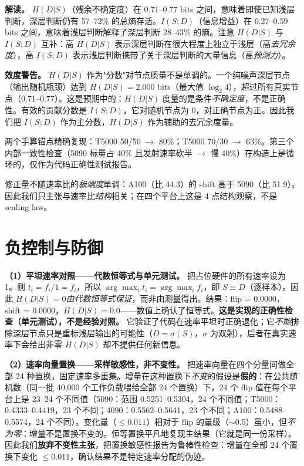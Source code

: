 \documentclass[10pt]{article}
\begin{document}
\textbf{解读。} $H(D|S)$（残余不确定度）在 0.71--0.77 bits 之间，意味着即使已知浅层判断，深层判断仍有 57--72\% 的总熵存活。$I(S;D)$（信息增益）在 0.27--0.59 bits 之间，意味着浅层判断解释了深层判断 28--43\% 的熵。注意 $H(D|S)$ 与 $I(S;D)$ 互补：高 $H(D|S)$ 表示深层判断在很大程度上独立于浅层（高\emph{去冗余度}），高 $I(S;D)$ 表示浅层判断携带了关于深层判断的大量信息（高\emph{预测力}）。

\textbf{效度警告。} $H(D|S)$ 作为"分数"对节点质量不是单调的。一个纯噪声深层节点（输出随机瓶颈）达到 $H(D|S)=2.000$ bits（最大值 $\log_2 4$），超过所有真实节点（0.71--0.77）。这是预期中的：$H(D|S)$ 度量的是条件\emph{不确定度}，不是正确性。有效的贡献分数是 $I(S;D)$，它对随机节点为 0，对正确节点为正。因此我们把 $I(S;D)$ 作为主分数，$H(D|S)$ 作为辅助的去冗余度量。

两个手算锚点精确复现：T5000 50/50 $\rightarrow$ 80\%；T5000 70/30 $\rightarrow$ 63\%。第三个内部一致性检查（5090 标量占 40\% 且发射速率砍半 $\rightarrow$ 慢 40\%）在构造上是循环的，仅作为代码正确性测试报告。

修正量不随速率比的\emph{极端度}单调：A100（比 44.3）的 shift 高于 5090（比 51.9）。因此我们只主张与速率比\emph{结构}相关；在四个平台上这是 4 点结构观察，不是 scaling law。

\section{负控制与防御}\label{negative-controls-and-defenses}

\textbf{（1）平坦速率对照——代数恒等式与单元测试。} 把占位硬件的所有速率设为 1。则 $t_i = f_i/1 = f_i$，所以 $\arg\max_i t_i = \arg\max_i f_i$，即 $S \equiv D$（逐样本）。因此 $H(D|S) = 0$\emph{由代数恒等式保证}，而非由测量得出。结果：flip = 0.0000，shift = 0.0000，$H(D|S)=0.0$——数值上确认了恒等式。\textbf{这是实现的正确性检查（单元测试），不是经验对照。} 它验证了代码在速率平坦时正确退化；它\emph{不能}排除深层节点只是重标浅层输出的可能性（$D = \sigma(S)$，$\sigma$ 为双射），后者在真实速率下会给出非零 $H(D|S)$ 却不提供任何新信息。

\textbf{（2）速率向量置换——采样敏感性，非不变性。} 把速率向量在四个分量间做全部 24 种置换，固定速率多重集。增量在这种置换下\emph{不变}的假设是\textbf{假的}：在公共随机数（同一批 40,000 个工作负载喂给全部 24 个置换）下，24 个 flip 值在每个平台上是 23--24 个不同值（5090：范围 0.5251--0.5304，24 个不同值；T5000：0.4333--0.4419，23 个不同；4090：0.5562--0.5641，23 个不同；A100：0.5488--0.5574，24 个不同）。变化量（$\leq 0.011$）相对于 flip 的量级（$\sim$0.5）虽小，但\emph{不为零}：增量不是置换不变的。恒等置换平凡地复现主结果（它就是同一份采样）。因此我们\textbf{放弃不变性主张}，把置换敏感性报告为鲁棒性检查：增量在全部 24 个置换下变化 $\leq 0.011$，确认结果不是特定速率分配的伪迹。
\end{document}
